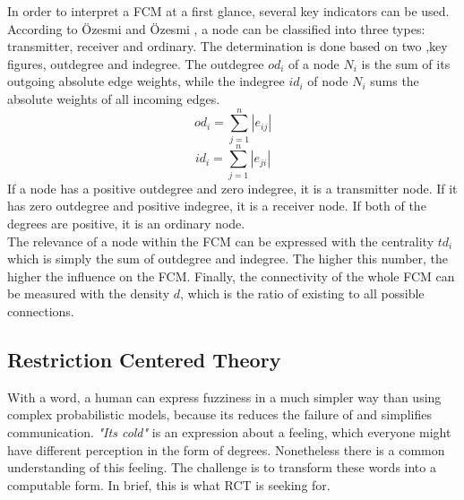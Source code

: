 \documentclass[conference]{IEEEtran}
\begin{document}
In order to interpret a FCM at a first glance, several key indicators can be used. According to \"Ozesmi and \"Ozesmi \cite{ozesmi2004}, a node can be classified into three types: transmitter, receiver and ordinary. The determination is done based on two ,key figures, outdegree and indegree. The outdegree \begin{math} od_{i} \end{math} of a node \begin{math} N_{i} \end{math} is the sum of its outgoing absolute edge weights, while the indegree \begin{math} id_{i} \end{math} of node \begin{math} N_{i} \end{math} sums the absolute weights of all incoming edges.\\
\begin{equation}
od_{i} = \sum_{j=1}^{n}|e_{ij}|
\end{equation}
\begin{equation}
id_{i} = \sum_{j=1}^{n}|e_{ji}|
\end{equation}
If a node has a positive outdegree and zero indegree, it is a transmitter node. If it has zero outdegree and positive indegree, it is a receiver node. If both of the degrees are positive, it is an ordinary node.\\
The relevance of a node within the FCM can be expressed with the centrality \begin{math}td_{i} \end{math} which is simply the sum of outdegree and indegree. The higher this number, the higher the influence on the FCM. Finally, the connectivity of the whole FCM can be measured with the density \begin{math} d \end{math}, which is the ratio of existing to all possible connections.\\

\subsection{Restriction Centered Theory}
With a word, a human can express fuzziness in a much simpler way than using complex probabilistic models, because its reduces the failure of and simplifies communication. \emph{"Its cold"} is an expression about a feeling, which everyone might have different perception in the form of degrees. Nonetheless there is a common understanding of this feeling. The challenge is to transform these words into a computable form. In brief, this is what RCT is seeking for.\\
\end{document}
